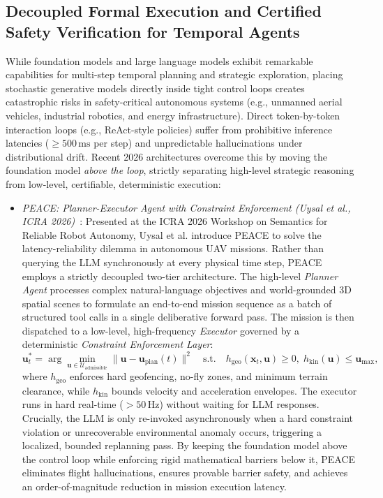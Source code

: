\subsection{Decoupled Formal Execution and Certified Safety Verification for Temporal Agents}
\label{sec:decoupled_safety_agents}

While foundation models and large language models exhibit remarkable capabilities for multi-step temporal planning and strategic exploration, placing stochastic generative models directly inside tight control loops creates catastrophic risks in safety-critical autonomous systems (e.g., unmanned aerial vehicles, industrial robotics, and energy infrastructure). Direct token-by-token interaction loops (e.g., ReAct-style policies) suffer from prohibitive inference latencies ($\ge 500\,\text{ms}$ per step) and unpredictable hallucinations under distributional drift. Recent 2026 architectures overcome this by moving the foundation model \emph{above the loop}, strictly separating high-level strategic reasoning from low-level, certifiable, deterministic execution:

\begin{itemize}[leftmargin=*]
    \item \emph{PEACE: Planner-Executor Agent with Constraint Enforcement (Uysal et al., ICRA 2026)}~\cite{uysal2026peace}: Presented at the ICRA 2026 Workshop on Semantics for Reliable Robot Autonomy, Uysal et al. introduce PEACE to solve the latency-reliability dilemma in autonomous UAV missions. Rather than querying the LLM synchronously at every physical time step, PEACE employs a strictly decoupled two-tier architecture. The high-level \emph{Planner Agent} processes complex natural-language objectives and world-grounded 3D spatial scenes to formulate an end-to-end mission sequence as a batch of structured tool calls in a single deliberative forward pass. The mission is then dispatched to a low-level, high-frequency \emph{Executor} governed by a deterministic \emph{Constraint Enforcement Layer}:
    \begin{equation}
        \mathbf{u}_t^* = \arg\min_{\mathbf{u} \in \mathcal{U}_{\text{admissible}}} \|\mathbf{u} - \mathbf{u}_{\text{plan}}(t)\|^2 \quad \text{s.t.} \quad h_{\text{geo}}(\mathbf{x}_t, \mathbf{u}) \ge 0, \; h_{\text{kin}}(\mathbf{u}) \le \mathbf{u}_{\max},
    \end{equation}
    where $h_{\text{geo}}$ enforces hard geofencing, no-fly zones, and minimum terrain clearance, while $h_{\text{kin}}$ bounds velocity and acceleration envelopes. The executor runs in hard real-time ($>50\,\text{Hz}$) without waiting for LLM responses. Crucially, the LLM is only re-invoked asynchronously when a hard constraint violation or unrecoverable environmental anomaly occurs, triggering a localized, bounded replanning pass. By keeping the foundation model above the control loop while enforcing rigid mathematical barriers below it, PEACE eliminates flight hallucinations, ensures provable barrier safety, and achieves an order-of-magnitude reduction in mission execution latency.
\end{itemize}

